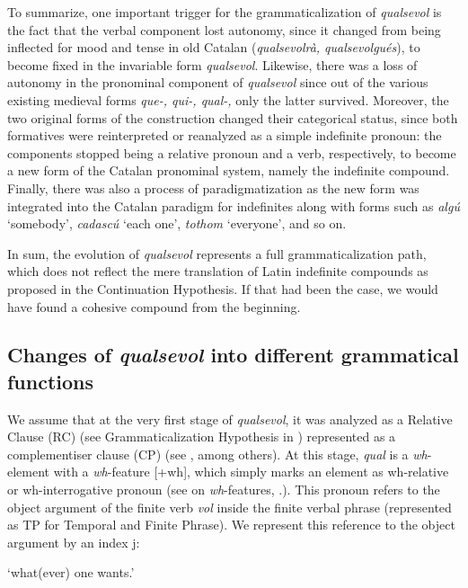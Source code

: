 \documentclass[output=paper,colorlinks,citecolor=brown]{langscibook}
\begin{document}
To summarize, one important trigger for the grammaticalization of \textit{qualsevol} is the fact that the verbal component lost autonomy, since it changed from being inflected for mood and tense in old Catalan (\textit{qualsevolrà, qualsevolgués}), to become fixed in the invariable form \textit{qualsevol}. Likewise, there was a loss of autonomy in the pronominal component of \textit{qualsevol} since out of the various existing medieval forms \textit{que-, qui-, qual-,} only the latter survived. Moreover, the two original forms of the construction changed their categorical status, since both formatives were reinterpreted or reanalyzed as a simple indefinite pronoun: the components stopped being a relative pronoun and a verb, respectively, to become a new form of the Catalan pronominal system, namely the indefinite compound. Finally, there was also a process of paradigmatization as the new form was integrated into the Catalan paradigm for indefinites along with forms such as \textit{algú} ‘somebody’, \textit{cadascú} ‘each one’, \textit{tothom} ‘everyone’, and so on.

In sum, the evolution of \textit{qualsevol} represents a full grammaticalization path, which does not reflect the mere translation of Latin indefinite compounds as proposed in the Continuation Hypothesis. If that had been the case, we would have found a cohesive compound from the beginning. 


\subsection{Changes of \textit{qualsevol} into different grammatical functions}\label{sec:kea6.2}\largerpage
We assume that at the very first stage of \textit{qualsevol}, it was analyzed as a Relative Clause (RC) (see Grammaticalization Hypothesis in ) represented as a complementiser clause (CP) (see \cite{Rivero1988}, among others). At this stage, \textit{qual} is a \textit{wh}-element with a \textit{wh}-feature [+wh], which simply marks an element as wh-relative or wh-interrogative pronoun (see \cite{Kellert2015} on \textit{wh}-features, \cite{Kellert2021c}.). This pronoun refers to the object argument of the finite verb \textit{vol} inside the finite verbal phrase (represented as TP for Temporal and Finite Phrase). We represent this reference to the object argument by an index j:

\glt    ‘what(ever) one wants.’
\z
\end{document}
